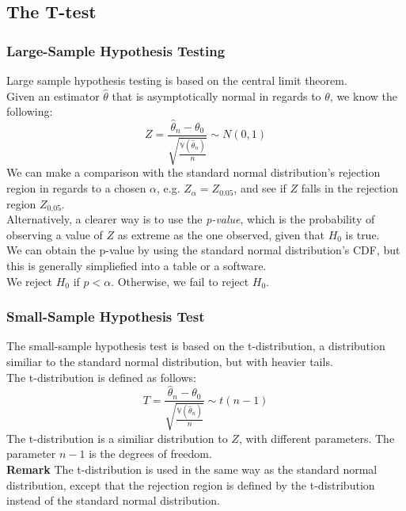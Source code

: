 \documentclass[sn-mathphys,Numbered]{sn-jnl}%
\newcommand{\Var}{\mathbb{V}}
\newcommand{\Remark}{\textbf{Remark }}
\begin{document}
\subsection{The T-test}\label{t-test}
\subsubsection{Large-Sample Hypothesis Testing}\label{large-sample-testing}
Large sample hypothesis testing is based on the central limit theorem. \\ Given
an estimator $\hat \theta$ that is asymptotically normal in regards to
$\theta$, we know the following:
\begin{equation}
    Z = \frac{\hat{\theta}_n - \theta_0}{\sqrt{\frac{\Var(\hat{\theta}_n)}{n}}} \sim N(0, 1)
\end{equation}
We can make a comparison with the standard normal distribution's rejection region in regards to a chosen $\alpha$, e.g. $Z_\alpha = Z_{0.05}$, and see if $Z$ falls in the rejection region $Z_{0.05}$.\\
Alternatively, a clearer way is to use the \textit{p-value}, which is the probability of observing a value of $Z$ as extreme as the one observed, given that $H_0$ is true.\\ We can obtain the p-value by using the standard normal distribution's CDF, but this is generally simpliefied into a table or a software.\\
We reject $H_0$ if $p < \alpha$. Otherwise, we fail to reject $H_0$.\\

\subsubsection{Small-Sample Hypothesis Test}\label{small-sample-testing}
The small-sample hypothesis test is based on the t-distribution, a distribution
similiar to the standard normal distribution, but with heavier tails.\\ The
t-distribution is defined as follows:
\begin{equation}
    T = \frac{\hat{\theta}_n - \theta_0}{\sqrt{\frac{\Var(\hat{\theta}_n)}{n}}} \sim t(n-1)
\end{equation}
The t-distribution is a similiar distribution to $Z$, with different
parameters. The parameter $n-1$ is the degrees of freedom.\\ \Remark The
t-distribution is used in the same way as the standard normal distribution,
except that the rejection region is defined by the t-distribution instead of
the standard normal distribution.\\
\end{document}
